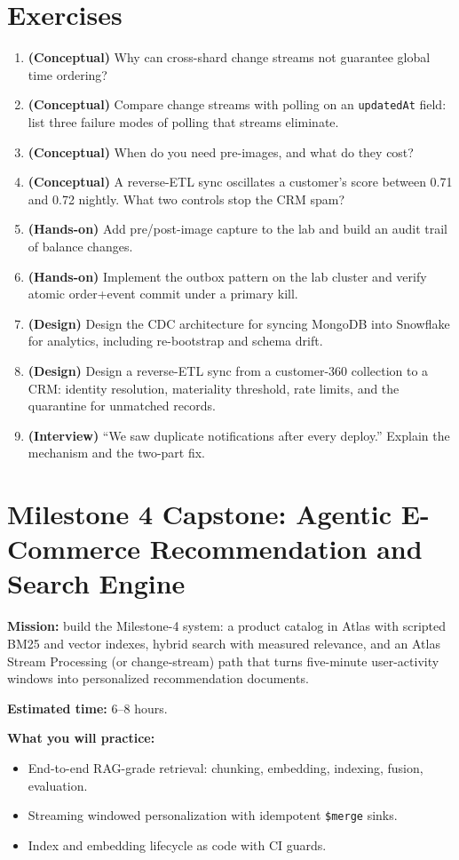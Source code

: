 \section{Exercises}
\begin{enumerate}
    \item \textbf{(Conceptual)} Why can cross-shard change streams not guarantee global time ordering?
    \item \textbf{(Conceptual)} Compare change streams with polling on an \texttt{updatedAt} field: list three failure modes of polling that streams eliminate.
    \item \textbf{(Conceptual)} When do you need pre-images, and what do they cost?
    \item \textbf{(Conceptual)} A reverse-ETL sync oscillates a customer's score between 0.71 and 0.72 nightly. What two controls stop the CRM spam?
    \item \textbf{(Hands-on)} Add pre/post-image capture to the lab and build an audit trail of balance changes.
    \item \textbf{(Hands-on)} Implement the outbox pattern on the lab cluster and verify atomic order+event commit under a primary kill.
    \item \textbf{(Design)} Design the CDC architecture for syncing MongoDB into Snowflake for analytics, including re-bootstrap and schema drift.
    \item \textbf{(Design)} Design a reverse-ETL sync from a customer-360 collection to a CRM: identity resolution, materiality threshold, rate limits, and the quarantine for unmatched records.
    \item \textbf{(Interview)} ``We saw duplicate notifications after every deploy.'' Explain the mechanism and the two-part fix.
\end{enumerate}

\section{Milestone 4 Capstone: Agentic E-Commerce Recommendation and Search Engine}\label{sec:ch16-capstone}

\begin{capstonebox}
\textbf{Mission:} build the Milestone-4 system: a product catalog in Atlas with scripted BM25 and vector indexes, hybrid search with measured relevance, and an Atlas Stream Processing (or change-stream) path that turns five-minute user-activity windows into personalized recommendation documents.

\textbf{Estimated time:} 6--8 hours.

\textbf{What you will practice:}
\begin{itemize}
    \item End-to-end RAG-grade retrieval: chunking, embedding, indexing, fusion, evaluation.
    \item Streaming windowed personalization with idempotent \texttt{\$merge} sinks.
    \item Index and embedding lifecycle as code with CI guards.
\end{itemize}
\end{capstonebox}

